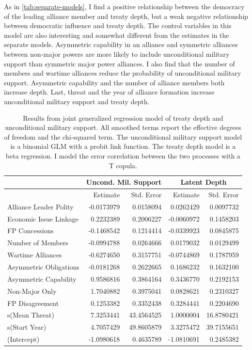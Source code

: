 \documentclass[12pt]{article}
\begin{document}
As in \autoref{tab:separate-models}, I find a positive relationship between the democracy of the leading alliance member and treaty depth, but a weak negative relationship between democratic influence and treaty depth.  
The control variables in this model are also interesting and somewhat different from the estimates in the separate models.  
Asymmetric capability in an alliance and symmetric alliances between non-major powers are more likely to include unconditional military support than symmetric major power alliances. 
I also find that the number of members and wartime alliances reduce the probability of unconditional military support. 
Asymmetric capability and the number of alliance members both increase depth. 
Last, threat and the year of alliance formation increase unconditional military support and treaty depth. 


\begin{table}[ht]
\centering
\begin{tabular}{lrrrr}
  & \multicolumn{2}{c}{Uncond. Mil. Support} & \multicolumn{2}{c}{Latent Depth}\\ \hline
  & Estimate & Std. Error & Estimate & Std. Error \\ 
  \hline
  Alliance Leader Polity & -0.0173979 & 0.0158094 & 0.0262429 & 0.0097732 \\ 
  Economic Issue Linkage & 0.2232389 & 0.2006227 & -0.0060972 & 0.1458203 \\ 
  FP Concessions & -0.1468542 & 0.1214414 & -0.0339923 & 0.0845875 \\ 
  Number of Members & -0.0994788 & 0.0264666 & 0.0179032 & 0.0129499 \\ 
  Wartime Alliances & -0.6274650 & 0.3157751 & -0.0744869 & 0.1787959 \\ 
  Asymmetric Obligations & -0.0181268 & 0.2622665 & 0.1686232 & 0.1632100 \\ 
  Asymmetric Capability & 0.9586816 & 0.3864164 & 0.3436770 & 0.2192153 \\ 
  Non-Major Only & 1.7040882 & 0.3975041 & 0.0828621 & 0.2310327 \\ 
  FP Disagreement & 0.1253382 & 0.3352438 & 0.3284441 & 0.2204690 \\ 
  s(Mean Threat) & 7.3253441 & 43.4564525 & 1.0000004 & 16.8780421 \\ 
  s(Start Year) & 4.7057429 & 49.8605879 & 3.3275472 & 39.7155651 \\
  (Intercept) & -1.0980618 & 0.4635789 & -1.0810691 & 0.2485382 \\  
   \hline
\end{tabular}
\caption{Results from joint generalized regression model of treaty depth and unconditional military support. 
                     All smoothed terms report the effective degrees of freedom and the chi-squared term. 
                     The unconditional military support model is a binomial GLM with a probit link function. 
                     The treaty depth model is a beta regression. 
                     I model the error correlation between the two processes with a T copula.} 
\label{tab:gjrm-res}
\end{table} 
\end{document}
